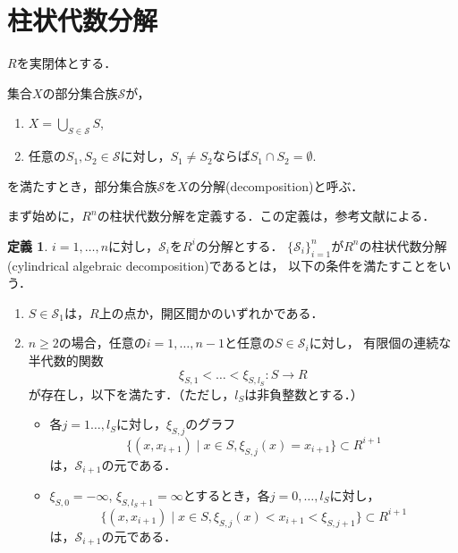 \documentclass[uplatex, dvipdfmx]{jsarticle}
\numberwithin{equation}{section}
\newcommand{\calS}{\mathcal{S}}
\newcommand{\map}[3]{{#1}\colon{#2}\rightarrow{#3}}
\theoremstyle{definition}
\newtheorem{definition}{定義}[section]
\begin{document}
\section{柱状代数分解}

$R$を実閉体とする．

集合$X$の部分集合族$\calS$が，
\begin{enumerate}
     \item $X = \bigcup_{S \in \calS} S$,
     \item 任意の$S_1, S_2 \in \calS$に対し，$S_1 \neq S_2$ならば$S_1 \cap S_2 = \emptyset$.
\end{enumerate}
を満たすとき，部分集合族$\calS$を$X$の分解(decomposition)と呼ぶ．

まず始めに，$R^n$の柱状代数分解を定義する．この定義は，参考文献\cite[Definition 5.1]{MR2248869}による．

\begin{definition} \label{definition:cad}
     $i=1, \dots, n$に対し，$\calS_i$を$R^i$の分解とする．
     $\{\calS_i\}_{i=1}^n$が$R^n$の柱状代数分解(cylindrical algebraic decomposition)であるとは，
     以下の条件を満たすことをいう．
     \begin{enumerate}
          \item $S \in \calS_1$は，$R$上の点か，開区間かのいずれかである．
          \item $n\geq 2$の場合，任意の$i=1, \dots, n-1$と任意の$S \in \calS_i$に対し，
          有限個の連続な半代数的関数
          \begin{equation}
               \map{\xi_{S,1}< \dots <\xi_{S,l_S}}{S}{R}
          \end{equation}
          が存在し，以下を満たす．（ただし，$l_S$は非負整数とする．）
          \begin{itemize}
               \item 各$j=1 \dots, l_S$に対し，$\xi_{S,j}$のグラフ
               \begin{equation}
                    \{(x,x_{i+1}) \mid x \in S, \xi_{S,j}(x)=x_{i+1} \} \subset R^{i+1}
               \end{equation}
               は，$\calS_{i+1}$の元である．
               \item $\xi_{S,0}=-\infty$, $\xi_{S,l_S+1}=\infty$とするとき，各$j=0, \dots, l_S$に対し，\label{cad_condition1}
               \begin{equation}
                    \{(x,x_{i+1}) \mid x \in S, \xi_{S,j}(x)<x_{i+1}<\xi_{S,j+1} \} \subset R^{i+1}
               \end{equation}
               は，$\calS_{i+1}$の元である．
          \end{itemize}
     \end{enumerate}
\end{definition}
\end{document}

